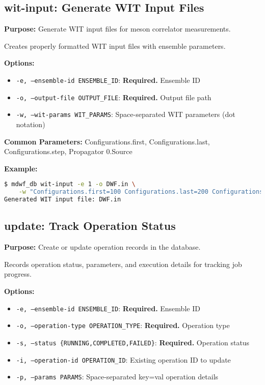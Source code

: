 \documentclass{article}
\begin{document}
\subsection{wit-input: Generate WIT Input Files}

\textbf{Purpose:} Generate WIT input files for meson correlator measurements.

Creates properly formatted WIT input files with ensemble parameters.

\textbf{Options:}
\begin{itemize}
\item \texttt{-e, --ensemble-id ENSEMBLE\_ID}: \textbf{Required.} Ensemble ID
\item \texttt{-o, --output-file OUTPUT\_FILE}: \textbf{Required.} Output file path
\item \texttt{-w, --wit-params WIT\_PARAMS}: Space-separated WIT parameters (dot notation)
\end{itemize}

\textbf{Common Parameters:}
Configurations.first, Configurations.last, Configurations.step, Propagator 0.Source

\textbf{Example:}
\begin{lstlisting}[language=bash]
$ mdwf_db wit-input -e 1 -o DWF.in \
    -w "Configurations.first=100 Configurations.last=200 Configurations.step=2"
Generated WIT input file: DWF.in
\end{lstlisting}

\subsection{update: Track Operation Status}

\textbf{Purpose:} Create or update operation records in the database.

Records operation status, parameters, and execution details for tracking job progress.

\textbf{Options:}
\begin{itemize}
\item \texttt{-e, --ensemble-id ENSEMBLE\_ID}: \textbf{Required.} Ensemble ID
\item \texttt{-o, --operation-type OPERATION\_TYPE}: \textbf{Required.} Operation type
\item \texttt{-s, --status \{RUNNING,COMPLETED,FAILED\}}: \textbf{Required.} Operation status
\item \texttt{-i, --operation-id OPERATION\_ID}: Existing operation ID to update
\item \texttt{-p, --params PARAMS}: Space-separated key=val operation details
\end{itemize}
\end{document}
